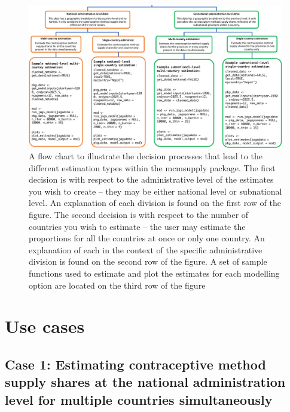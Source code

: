 \begin{figure}[H]
\includegraphics[width=1\linewidth,height=0.35\textheight]{figures/fig_2} \caption{A flow chart to illustrate the decision processes that lead to the different estimation types within the mcmsupply package. The first decision is with respect to the administrative level of the estimates you wish to create – they may be either national level or subnational level. An explanation of each division is found on the first row of the figure. The second decision is with respect to the number of countries you wish to estimate – the user may estimate the proportions for all the countries at once or only one country. An explanation of each in the context of the specific administrative division is found on the second row of the figure. A set of sample functions used to estimate and plot the estimates for each modelling option are located on the third row of the figure}\label{fig:fig-2}
\end{figure}

\section{Use cases}\label{use-cases}

\subsection{Case 1: Estimating contraceptive method supply shares at the national administration level for multiple countries simultaneously}\label{case-1-estimating-contraceptive-method-supply-shares-at-the-national-administration-level-for-multiple-countries-simultaneously}

